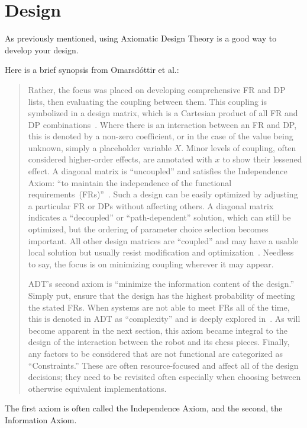 \documentclass{svproc}
\begin{document}
\section{Design}\label{sec:design}
As previously mentioned, using Axiomatic Design Theory is a good way to develop your design.

Here is a brief synopsis from Omarsdóttir et al.\cite{omarsdottir2016chessmate}:
\begin{quotation}
  Rather, the focus was placed on developing comprehensive FR and DP lists, then evaluating the coupling between them.
  This coupling is symbolized in a design matrix, which is a Cartesian product of all FR and DP combinations~\cite{cochran2016msdd,benevides2012aed}.
Where there is an interaction between an FR and DP, this is denoted by a non-zero coefficient, or in the case of the value being unknown, simply a placeholder variable $X$.
Minor levels of coupling, often considered higher-order effects, are annotated with $x$ to show their lessened effect.
A diagonal matrix is ``uncoupled'' and satisfies the Independence Axiom: ``to maintain the independence of the functional requirements~(FRs)''~\cite{suh2001axiomatic}.
Such a design can be easily optimized by adjusting a particular FR or DPs without affecting others.
A diagonal matrix indicates a ``decoupled'' or ``path-dependent'' solution, which can still be optimized, but the ordering of parameter choice selection becomes important.
All other design matrices are ``coupled'' and may have a usable local solution but usually resist modification and optimization~\cite{suh2001axiomatic}.
Needless to say, the focus is on minimizing coupling wherever it may appear.

ADT's second axiom is ``minimize the information content of the design.''
Simply put, ensure that the design has the highest probability of meeting the stated FRs.
When systems are not able to meet FRs all of the time, this is denoted in ADT as ``complexity'' and is deeply explored in~\cite{suh2005complexity}.
As will become apparent in the next section, this axiom became integral to the design of the interaction between the robot and its chess pieces.
Finally, any factors to be considered that are not functional are categorized as ``Constraints.''
These are often resource-focused and affect all of the design decisions; they need to be revisited often especially when choosing between otherwise equivalent implementations.
\end{quotation}
The first axiom is often called the Independence Axiom, and the second, the Information Axiom.
\end{document}
